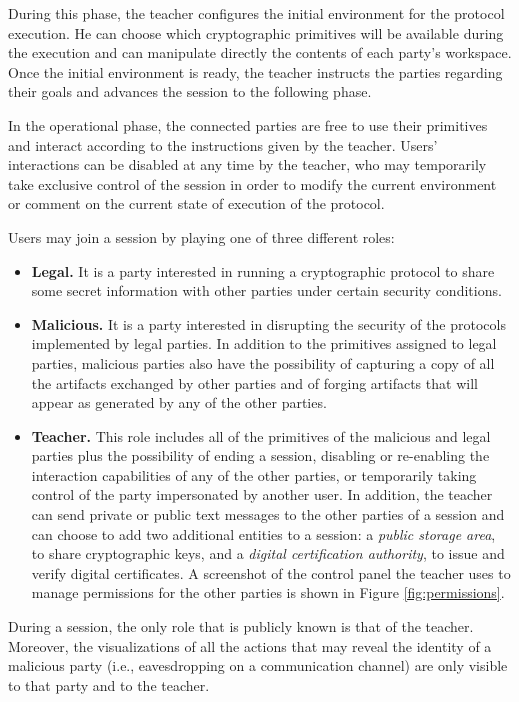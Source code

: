 \documentclass[10pt,conference]{IEEEtran}
\begin{document}
During this phase, the teacher configures the initial environment
for the protocol execution. He can choose which cryptographic
primitives will be available during the execution and can manipulate
directly the contents of each party's workspace. Once the initial
environment is ready, the teacher instructs the parties regarding their goals and advances the session to the following phase. 

In the operational phase, the connected parties are free to use their
primitives and interact according to the instructions given by the
teacher. Users' interactions can be disabled at any time by the
teacher, who may temporarily take exclusive control of the session in
order to modify the current environment or comment on the current
state of execution of the protocol.

Users may join a session by playing one of three different roles:

\begin{itemize}
\item{\bf Legal.} It is a party interested in running a cryptographic protocol
to share some secret information with other parties under certain
security conditions.

\item{\bf Malicious.} It is a party interested in
disrupting the security of the protocols implemented by legal parties.
In addition to the primitives assigned to legal parties, malicious
parties also have the possibility of capturing a copy of all the
artifacts exchanged by other parties and of forging artifacts that
will appear as generated by any of the other parties.

\item{\bf Teacher.} This role includes all of the primitives of the malicious and
legal parties plus the possibility of ending a session, disabling or
re-enabling the interaction capabilities of any of the other parties,
or temporarily taking control of the party impersonated by another
user. In addition, the teacher can send private or public text
messages to the other parties of a session and can choose to add two
additional entities to a session: a {\em public storage area}, to share
cryptographic keys, and a {\em digital certification authority}, to
issue and verify digital certificates. A screenshot of the control
panel the teacher uses to manage permissions for the other parties is shown in
Figure \ref{fig:permissions}.
\end{itemize}

During a session, the only role that is publicly known is that of the
teacher. Moreover, the visualizations of all the actions that may
reveal the identity of a malicious party (i.e., eavesdropping on a
communication channel) are only visible to that party and to the
teacher.
\end{document}

